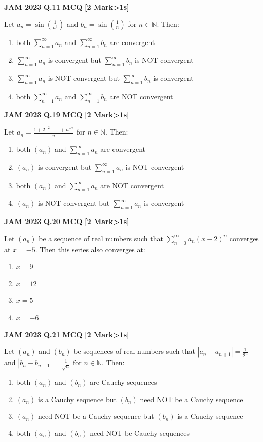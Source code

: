 \documentclass[11pt,a4paper]{article}
\newcommand{\pyqheader}[4]{%
    \noindent\begin{tcolorbox}[
        colback=badgebg,
        colframe=secondary,
        arc=2mm,
        boxrule=0.6pt,
        top=1.5mm,bottom=1.5mm,left=2mm,right=2mm
    ]
        \textbf{\textcolor{primary}{JAM #1}} \hfill \textbf{Q.#2} \hfill \textsc{\textbf{#3}} \hfill \textbf{[#4 Mark\ifnum#4>1s\fi]}
    \end{tcolorbox}\vspace{-1mm}
}
\begin{document}
\pyqheader{2023}{11}{MCQ}{2}
Let $a_{n}=\sin(\frac{1}{n^{3}})$ and $b_{n}=\sin(\frac{1}{n})$ for $n\in\mathbb{N}$. Then:
\begin{enumerate}[label=(\Alph*)]
    \item both $\sum_{n=1}^{\infty} a_{n}$ and $\sum_{n=1}^{\infty} b_{n}$ are convergent
    \item $\sum_{n=1}^{\infty} a_{n}$ is convergent but $\sum_{n=1}^{\infty} b_{n}$ is NOT convergent
    \item $\sum_{n=1}^{\infty} a_{n}$ is NOT convergent but $\sum_{n=1}^{\infty} b_{n}$ is convergent
    \item both $\sum_{n=1}^{\infty} a_{n}$ and $\sum_{n=1}^{\infty} b_{n}$ are NOT convergent
\end{enumerate}

\pyqheader{2023}{19}{MCQ}{2}
Let $a_{n}=\frac{1+2^{-2}+\cdots+n^{-2}}{n}$ for $n\in\mathbb{N}$. Then:
\begin{enumerate}[label=(\Alph*)]
    \item both $(a_{n})$ and $\sum_{n=1}^{\infty} a_{n}$ are convergent
    \item $(a_{n})$ is convergent but $\sum_{n=1}^{\infty} a_{n}$ is NOT convergent
    \item both $(a_{n})$ and $\sum_{n=1}^{\infty} a_{n}$ are NOT convergent
    \item $(a_{n})$ is NOT convergent but $\sum_{n=1}^{\infty} a_{n}$ is convergent
\end{enumerate}

\pyqheader{2023}{20}{MCQ}{2}
Let $(a_{n})$ be a sequence of real numbers such that $\sum_{n=0}^{\infty}a_{n}(x-2)^{n}$ converges at $x=-5$. Then this series also converges at:
\begin{enumerate}[label=(\Alph*)]
    \item $x=9$
    \item $x=12$
    \item $x=5$
    \item $x=-6$
\end{enumerate}

\pyqheader{2023}{21}{MCQ}{2}
Let $(a_{n})$ and $(b_{n})$ be sequences of real numbers such that $|a_{n}-a_{n+1}|=\frac{1}{2^{n}}$ and $|b_{n}-b_{n+1}|=\frac{1}{\sqrt{n}}$ for $n\in\mathbb{N}$. Then:
\begin{enumerate}[label=(\Alph*)]
    \item both $(a_{n})$ and $(b_{n})$ are Cauchy sequences
    \item $(a_{n})$ is a Cauchy sequence but $(b_{n})$ need NOT be a Cauchy sequence
    \item $(a_{n})$ need NOT be a Cauchy sequence but $(b_{n})$ is a Cauchy sequence
    \item both $(a_{n})$ and $(b_{n})$ need NOT be Cauchy sequences
\end{enumerate}
\end{document}
